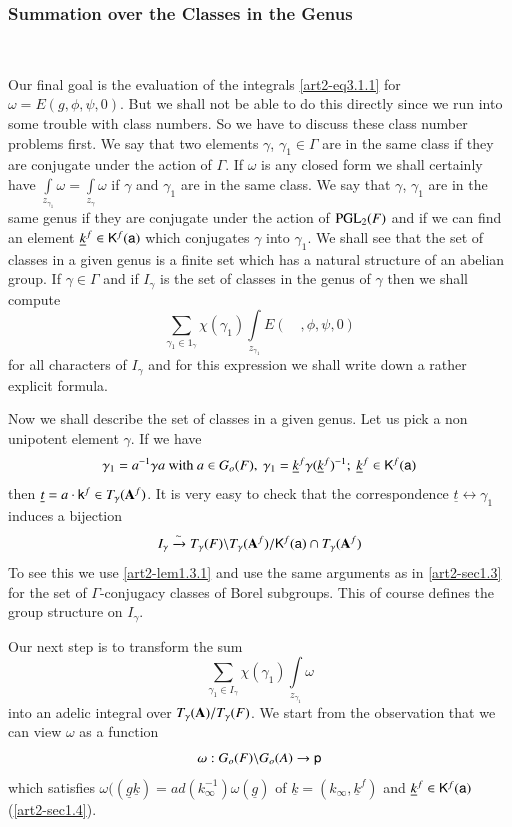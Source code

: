 \setcounter{subsubsection}{1}
\subsubsection{Summation over the Classes in the Genus}\label{art2-sec3.1.2}\pageoriginale
~

Our final goal is the evaluation of the integrals \eqref{art2-eq3.1.1} for $\omega=E(g,\phi,\psi,0)$. But we shall not be able to do this directly since we run into some trouble with class numbers. So we have to discuss these class number problems first. We say that two elements $\gamma$, $\gamma_{1}\in \Gamma$ are in the same class if they are conjugate under the action of $\Gamma$. If $\omega$ is any closed form we shall certainly have $\int\limits_{z_{\gamma_{1}}}\omega=\int\limits_{z_{\gamma}}\omega$ if $\gamma$ and $\gamma_{1}$ are in the same class. We say that $\gamma$, $\gamma_{1}$ are in the same genus if they are conjugate under the action of $\mathrm{PGL}_{2}(F)$ and if we can find an element $\underline{k}^{f}\in \mathsf{K}^{f}(\mathsf{a})$ which conjugates $\gamma$ into $\gamma_{1}$. We shall see that the set of classes in a given genus is a finite set which has a natural structure of an abelian group. If $\gamma\in \Gamma$ and if $I_{\gamma}$ is the set of classes in the genus of $\gamma$ then we shall compute
$$
\sum\limits_{\gamma_{1}\in 1_{\gamma}}\chi(\gamma_{1})\int\limits_{z_{\gamma_{1}}}E(\quad,\phi,\psi,0)
$$
for all characters of $I_{\gamma}$ and for this expression we shall write down a rather explicit formula.

Now we shall describe the set of classes in a given genus. Let us pick a non unipotent element $\gamma$. If we have
$$
\gamma_{1}=a^{-1}\gamma a\text{~ with~ } a\in G_{o}(F), \ \gamma_{1}=\underline{k}^{f}\gamma(\underline{k}^{f})^{-1}; \ \underline{k}^{f}\in \sfK^{f}(\sfa)
$$
then $\underline{t}=a\cdot \mathsf{k}^{f}\in T_{\gamma}(\mathbf{A}^{f})$. It is very easy to check that the correspondence $\underline{t}\leftrightarrow \gamma_{1}$ induces a bijection
$$
I_{\gamma}\xrightarrow{\sim}T_{\gamma}(F)\backslash T_{\gamma}(\mathbf{A}^{f})/\mathsf{K}^{f}(\mathsf{a})\cap T_{\gamma}(\mathbf{A}^{f})
$$
To see this we use \ref{art2-lem1.3.1} and use the same arguments as in \ref{art2-sec1.3} for the set of $\Gamma$-conjugacy classes of Borel subgroups. This of course defines the group structure on $I_{\gamma}$.

Our next step is to transform the sum
$$
\sum\limits_{\gamma_{1}\in I_{\gamma}}\chi(\gamma_{1})\int\limits_{z_{\gamma_{1}}}\omega
$$
into an adelic integral over $T_{\gamma}(\mathbf{A})/T_{\gamma}(F)$. We start from the observation that we can view $\omega$ as a function
$$
\omega:G_{o}(F)\backslash G_{o}(A)\to \mathsf{p}
$$
which satisfies $\omega((\underline{g}\underline{k})=ad(k^{-1}_{\infty})\omega(\underline{g})$ of $\underline{k}=(k_{\infty},\underline{k}^{f})$ and $\underline{k}^{f}\in \mathsf{K}^{f}(\mathsf{a})$ (\ref{art2-sec1.4}).

